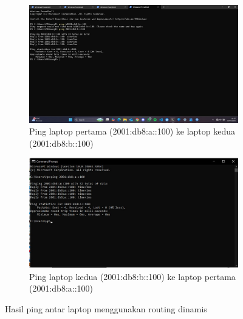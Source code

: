 \begin{figure}[H]
	\centering
	\begin{subfigure}[b]{0.4\linewidth}
		\centering
		\includegraphics[width=\linewidth]{P2/img/router 1 laptop 1 (8).jpg}
		\caption{Ping laptop pertama (2001:db8:a::100) ke laptop kedua (2001:db8:b::100)\label{fig:konfigurasiR1}}
	\end{subfigure}
	\begin{subfigure}[b]{0.4\linewidth}
		\centering
		\includegraphics[width=\linewidth]{P2/img/router2 laptop2 (7).jpg}
		\caption{Ping laptop kedua (2001:db8:b::100) ke laptop pertama (2001:db8:a::100)\label{fig:konfigurasiR2}}
	\end{subfigure}
	\caption{Hasil ping antar laptop menggunakan routing dinamis}
	\hspace{1cm}
\end{figure}

